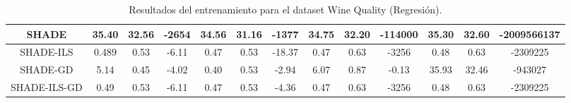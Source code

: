 \begin{table}[H]
{\begin{tabular}{|c|ccc|ccc|ccc|ccc|}
SHADE                                                & \multicolumn{1}{c|}{35.40}         & \multicolumn{1}{c|}{32.56}         & -2654          & \multicolumn{1}{c|}{34.56}         & \multicolumn{1}{c|}{31.16}         & -1377          & \multicolumn{1}{c|}{34.75}         & \multicolumn{1}{c|}{32.20}         & -114000       & \multicolumn{1}{c|}{35.30}         & \multicolumn{1}{c|}{32.60}         & -2009566137    \\ \hline
SHADE-ILS                                            & \multicolumn{1}{c|}{0.489}         & \multicolumn{1}{c|}{0.53}          & -6.11          & \multicolumn{1}{c|}{0.47}          & \multicolumn{1}{c|}{0.53}          & -18.37         & \multicolumn{1}{c|}{0.47}          & \multicolumn{1}{c|}{0.63}          & -3256         & \multicolumn{1}{c|}{0.48}          & \multicolumn{1}{c|}{0.63}          & -2309225       \\ \hline
SHADE-GD                                             & \multicolumn{1}{c|}{5.14}          & \multicolumn{1}{c|}{0.45}          & -4.02          & \multicolumn{1}{c|}{0.40}          & \multicolumn{1}{c|}{0.53}          & -2.94          & \multicolumn{1}{c|}{6.07}          & \multicolumn{1}{c|}{0.87}          & -0.13         & \multicolumn{1}{c|}{35.93}         & \multicolumn{1}{c|}{32.46}         & -943027        \\ \hline
SHADE-ILS-GD                                         & \multicolumn{1}{c|}{0.49}          & \multicolumn{1}{c|}{0.53}          & -6.11          & \multicolumn{1}{c|}{0.47}          & \multicolumn{1}{c|}{0.53}          & -4.36          & \multicolumn{1}{c|}{0.47}          & \multicolumn{1}{c|}{0.63}          & -3256         & \multicolumn{1}{c|}{0.48}          & \multicolumn{1}{c|}{0.63}          & -2309225       \\ \hline
\end{tabular}}
\caption{Resultados del entrenamiento para el dataset Wine Quality (Regresión).}
\label{tab:wqr}
\end{table}

